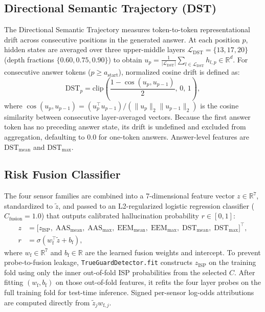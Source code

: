 \documentclass{ieeeaccess}
\begin{document}
\subsection{Directional Semantic Trajectory (DST)}
The Directional Semantic Trajectory measures token-to-token representational drift across consecutive positions in the generated answer. At each position $p$, hidden states are averaged over three upper-middle layers $\mathcal{L}_{\text{DST}} = \{13, 17, 20\}$ (depth fractions $\{0.60, 0.75, 0.90\}$) to obtain $u_p = \frac{1}{|\mathcal{L}_{\text{DST}}|} \sum_{l \in \mathcal{L}_{\text{DST}}} h_{l,p} \in \mathbb{R}^{d}$. For consecutive answer tokens ($p \ge a_{\text{start}}$), normalized cosine drift is defined as:
\begin{equation}
\text{DST}_p = \text{clip}\!\left(\frac{1 - \cos(u_p, u_{p-1})}{2},\, 0,\, 1\right),
\label{eq:dst}
\end{equation}
where $\cos(u_p, u_{p-1}) = (u_p^\top u_{p-1}) / (\|u_p\|_2 \|u_{p-1}\|_2)$ is the cosine similarity between consecutive layer-averaged vectors. Because the first answer token has no preceding answer state, its drift is undefined and excluded from aggregation, defaulting to $0.0$ for one-token answers. Answer-level features are $\text{DST}_{\text{mean}}$ and $\text{DST}_{\text{max}}$.

\subsection{Risk Fusion Classifier}
The four sensor families are combined into a 7-dimensional feature vector $z \in \mathbb{R}^7$, standardized to $\tilde{z}$, and passed to an L2-regularized logistic regression classifier ($C_{\text{fusion}} = 1.0$) that outputs calibrated hallucination probability $r \in [0, 1]$:
\begin{equation}
\begin{aligned}
z &= \big[z_{\text{ISP}},\; \text{AAS}_{\text{mean}},\; \text{AAS}_{\text{max}},\; \text{EEM}_{\text{mean}},\; \text{EEM}_{\text{max}},\; \text{DST}_{\text{mean}},\; \text{DST}_{\text{max}}\big]^\top, \\
r &= \sigma\!\left(w_{\text{f}}^\top \tilde{z} + b_{\text{f}}\right),
\end{aligned}
\label{eq:fusion}
\end{equation}
where $w_{\text{f}} \in \mathbb{R}^7$ and $b_{\text{f}} \in \mathbb{R}$ are the learned fusion weights and intercept. To prevent probe-to-fusion leakage, \texttt{TrueGuardDetector.fit} constructs $z_{\text{ISP}}$ on the training fold using only the inner out-of-fold ISP probabilities from the selected $C$. After fitting $(w_{\text{f}}, b_{\text{f}})$ on those out-of-fold features, it refits the four layer probes on the full training fold for test-time inference. Signed per-sensor log-odds attributions are computed directly from $\tilde{z}_j w_{\text{f},j}$.
\end{document}
